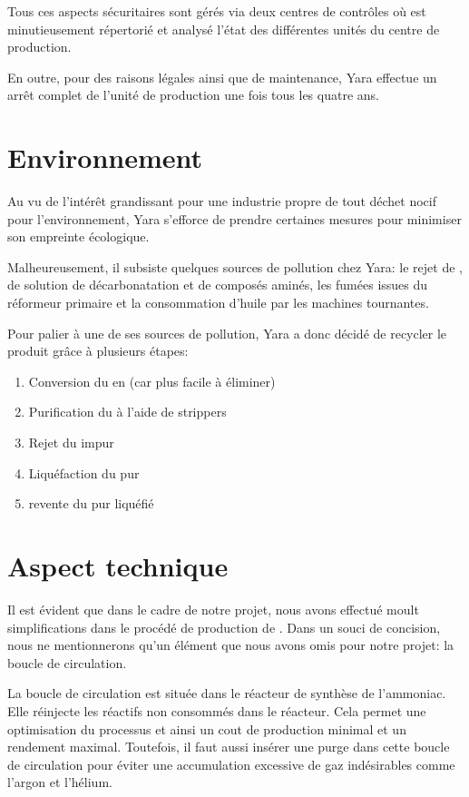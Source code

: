 \documentclass[a4paper,12pt, oneside]{article}
\begin{document}
		Tous ces aspects sécuritaires sont gérés via deux centres de contrôles où est minutieusement répertorié et analysé l'état des différentes unités du centre de production.
		
		En outre, pour des raisons légales ainsi que de maintenance, Yara effectue un arrêt complet de l'unité de production une fois tous les quatre ans.
		
\section{Environnement}
	Au vu de l'intérêt grandissant pour une industrie propre de tout déchet nocif pour l'environnement, Yara  s'efforce de prendre certaines mesures pour minimiser son empreinte écologique. 
	
	Malheureusement, il subsiste quelques sources de pollution chez Yara: le rejet de , de solution de décarbonatation et de composés aminés, les fumées issues du réformeur primaire et la consommation d'huile par les machines tournantes.
	
	Pour palier à une de ses sources de pollution, Yara a donc décidé de recycler le  produit grâce à plusieurs étapes:
		\begin{enumerate}
		\item Conversion du  en  (car plus facile à éliminer)
		\item Purification du  à l'aide de strippers
		\item Rejet du  impur
		\item Liquéfaction du  pur
		\item revente du  pur liquéfié
		\end{enumerate}
		
\section{Aspect technique}
	Il est évident que dans le cadre de notre projet, nous avons effectué moult simplifications dans le procédé de production de . Dans un souci de concision, nous ne mentionnerons qu'un élément que nous avons omis pour notre projet: la boucle de circulation.
	
	La boucle de circulation est située dans le réacteur de synthèse de l'ammoniac. Elle réinjecte les réactifs non consommés dans le réacteur. Cela permet une optimisation du processus et ainsi un cout de production minimal et un rendement maximal. Toutefois, il faut aussi insérer une purge dans cette boucle de circulation pour éviter une accumulation excessive de gaz indésirables comme l'argon et l'hélium.
		
\end{document}
